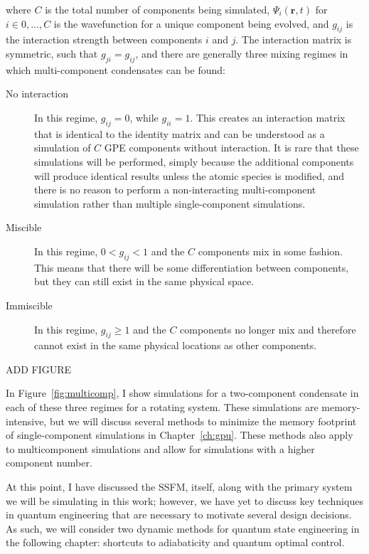 \noindent where $C$ is the total number of components being simulated, $\Psi_i(\mathbf{r},t)$ for $i \in {0,...,C}$ is the wavefunction for a unique component being evolved, and $g_{ij}$ is the interaction strength between components $i$ and $j$.
The interaction matrix is symmetric, such that $g_{ji} = g_{ij}$, and there are generally three mixing regimes in which multi-component condensates can be found:

\begin{description}
\item[No interaction] In this regime, $g_{ij}=0$, while $g_{ii} = 1$. This creates an interaction matrix that is identical to the identity matrix and can be understood as a simulation of $C$ GPE components without interaction. It is rare that these simulations will be performed, simply because the additional components will produce identical results unless the atomic species is modified, and there is no reason to perform a non-interacting multi-component simulation rather than multiple single-component simulations.
\item[Miscible] In this regime, $0 < g_{ij} < 1$ and the $C$ components mix in some fashion. This means that there will be some differentiation between components, but they can still exist in the same physical space.
\item[Immiscible] In this regime, $g_{ij} \geq 1$ and the $C$ components no longer mix and therefore cannot exist in the same physical locations as other components.
\end{description}

ADD FIGURE

In Figure~\ref{fig:multicomp}, I show simulations for a two-component condensate in each of these three regimes for a rotating system.
These simulations are memory-intensive, but we will discuss several methods to minimize the memory footprint of single-component simulations in Chapter~\ref{ch:gpu}.
These methods also apply to multicomponent simulations and allow for simulations with a higher component number.

At this point, I have discussed the SSFM, itself, along with the primary system we will be simulating in this work; however, we have yet to discuss key techniques in quantum engineering that are necessary to motivate several design decisions.
As such, we will consider two dynamic methods for quantum state engineering in the following chapter: shortcuts to adiabaticity and quantum optimal control.

